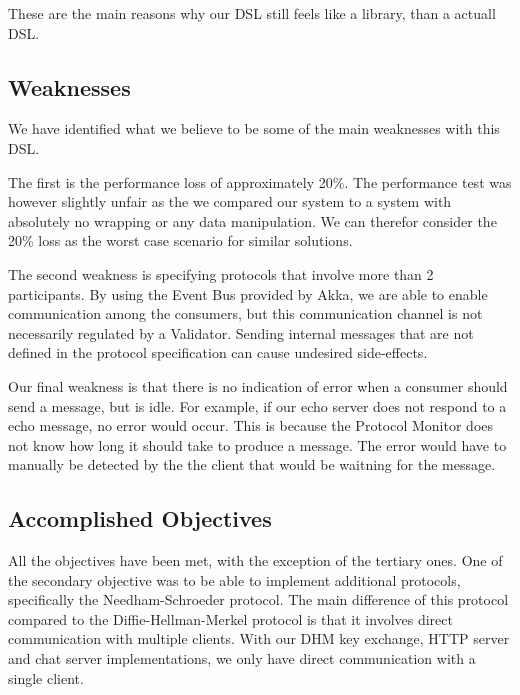 These are the main reasons why our DSL still feels like a library, than a actuall DSL.
\subsection{Weaknesses}
We have identified what we believe to be some of the main weaknesses with this DSL.

The first is the performance loss of approximately 20\%. The performance test was however slightly unfair as the we compared our system to a system with absolutely no wrapping or any data manipulation. We can therefor consider the 20\% loss as the worst case scenario for similar solutions.

The second weakness is specifying protocols that involve more than 2 participants. By using the Event Bus provided by Akka, we are able to enable communication among the consumers, but this communication channel is not necessarily regulated by a Validator. Sending internal messages that are not defined in the protocol specification can cause undesired side-effects. 

Our final weakness is that there is no indication of error when a consumer should send a message, but is idle. For example, if our echo server does not respond to a echo message, no error would occur. This is because the Protocol Monitor does not know how long it should take to produce a message. The error would have to manually be detected by the the client that would be waitning for the message.



\subsection{Accomplished Objectives}
All the objectives have been met, with the exception of the tertiary ones. One of the secondary objective was to be able to implement additional protocols, specifically the Needham-Schroeder protocol. The main difference of this protocol compared to the Diffie-Hellman-Merkel protocol is that it involves direct communication with multiple clients. With our DHM key exchange, HTTP server and chat server implementations, we only have direct communication with a single client.

